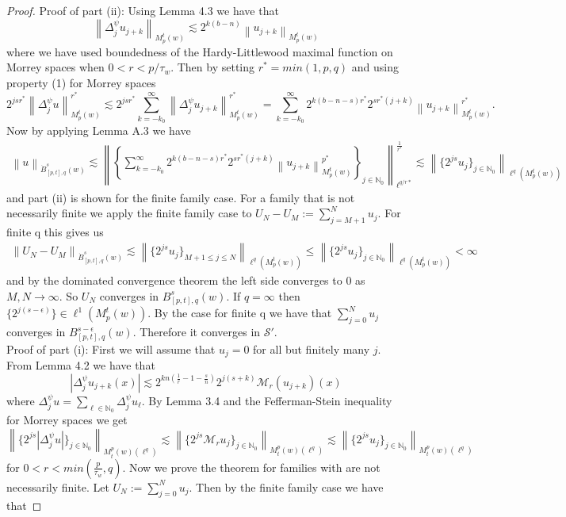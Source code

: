 \documentclass[10pt,a4paper]{article}
\theoremstyle{remark}
\newcommand{\naz}{\mathbb{N}_0}
\newcommand{\besw}[4]{\dot B_{#1,#3}^{#2}(#4)} %
\newcommand{\ibesw}[4]{B_{#1,#3}^{#2}(#4)} %
\newcommand{\mow}[3]{M_{#1}^{#2}(#3)}
\newcommand{\norm}[2]{\left\|#1\right\|_{#2}}
\begin{document}
\begin{proof}
Proof of part (ii): Using Lemma 4.3 we have that $$\norm{\Delta^\psi_j u_{j+k}}{\mow{p}{t}{w}} \lesssim 2^{k(b-n)} \norm{u_{j+k}}{\mow{p}{t}{w}}$$ where we have used boundedness of the Hardy-Littlewood maximal function on Morrey spaces when $0<r<p/\tau_w$. Then by setting $r^\ast = min(1,p,q)$ and using property (1) for Morrey spaces 
$$ 2^{jsr^\ast}\norm{\Delta^\psi_j u}{\mow{p}{t}{w}}^{r^\ast} \lesssim 2^{js r^*}\sum_{k = - k_0}^\infty \norm{\Delta^\psi_j  u_{j+k}}{\mow{p}{t}{w}}^{r^*}
 =  \sum_{k = - k_0}^\infty 2^{k(b-n -s) r^*} 2^{s r^* (j+k)}   \norm{u_{j+k}}{\mow{p}{t}{w}}^{r^*}.  $$ 
Now by applying Lemma A.3  we have 
\begin{align*}
\norm{u}{\besw{[p,t]}{s}{q}{w}}  \lesssim  \norm{\left\{ \sum_{k = - k_0}^\infty 2^{k(b-n -s) r^*}  2^{s r^* (j+k)}   \norm{u_{j+k}}{\mow{p}{t}{w}}^{p^*}\right\}_{j\in\naz}}{\ell^{q/r*}}^\frac{1}{r^*}\lesssim  \norm{\{2^{js} u_j\}_{j\in\naz}}{\ell^{q}(\mow{p}{t}{w})} 
\end{align*}
and part (ii) is shown for the finite family case. For a family that is not necessarily finite we apply the finite family case to $U_N - U_M := \sum_{j=M+1}^N u_j$. For finite q this gives us 
\begin{align*}
\norm{U_N - U_M}{\besw{[p,t]}{s}{q}{w}} \lesssim \norm{\{2^{js} u_j\}_{M+1\leq j \leq N}}{\ell^{q}(\mow{p}{t}{w})} \leq \norm{\{2^{js} u_j\}_{j\in\naz}}{\ell^{q}(\mow{p}{t}{w})} < \infty
\end{align*}
and by the dominated convergence theorem the left side converges to 0 as $M,N \rightarrow \infty$. So $U_N$ converges in $\ibesw{[p,t]}{s}{q}{w}.$ If $q = \infty$ then $\{2^{j(s-\epsilon)}\} \in \ell^1 (\mow{p}{t}{w})$. By the case for finite q we have that $\sum_{j=0}^N u_j$ converges in $\ibesw{[p,t]}{s-\epsilon}{q}{w}$. Therefore it converges in $\mathcal{S}'$. 
\\
Proof of part (i): First we will assume that $u_j = 0$ for all but finitely many $j$. From Lemma 4.2 we have that 
$$ |\Delta^\psi_j u_{j+k}(x)| \lesssim 2^{kn(\frac{1}{r} - 1 - \frac{s}{n})} 2^{j(s+k)}\mathcal{M}_r(u_{j+k})(x) $$
where $\Delta^\psi_j u = \sum_{\ell \in \naz} \Delta^{\psi}_j u_\ell.$ By Lemma 3.4 and the Fefferman-Stein inequality for Morrey spaces we get 
\[ \norm{ \{ 2^{js} |\Delta^\psi_j u| \}_{j\in\naz}}{M^p_t (w)(\ell^q)} \lesssim \norm{ \{ 2^{js} \mathcal{M}_r u_j \}_{j\in\naz}}{M^p_t (w)(\ell^q)} \lesssim \norm{ \{ 2^{js} u_j \}_{j\in\naz}}{M^p_t (w)(\ell^q)}\] 
for $0<r<min(\frac{p}{\tau_w},q)$.
Now we prove the theorem for families with are not necessarily finite. Let $U_N := \sum_{j=0}^N u_j$. Then by the finite family case we have that 

\end{proof}
\end{document}
